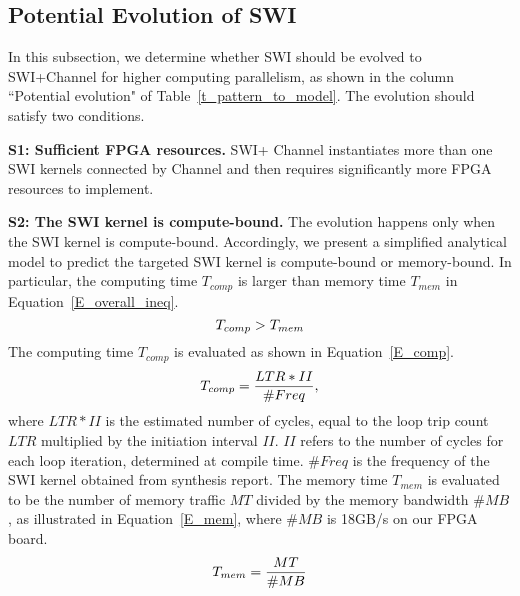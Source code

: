 \subsection{Potential Evolution of SWI}
\label{subsec_potential_prediction}
In this subsection, we determine whether SWI should be evolved to SWI+Channel for higher computing parallelism, as shown in the column ``Potential evolution" of Table~\ref{t_pattern_to_model}. The evolution should satisfy two conditions. 

\noindent
{\bf S1: Sufficient FPGA resources. }SWI+ Channel instantiates more than one SWI kernels connected by Channel and then requires significantly more FPGA resources to implement. %

\noindent
{\bf S2: The SWI kernel is compute-bound. }The evolution happens only when the SWI kernel is compute-bound. Accordingly, we present a simplified analytical model to predict the targeted SWI kernel is compute-bound or memory-bound. In particular, the computing time $T_{comp}$ is larger than memory time $T_{mem}$  in Equation~\ref{E_overall_ineq}.
\begin{equation} \begin{scriptsize}
\label{E_overall_ineq}
\vspace{-1ex}
T_{comp} > T_{mem}
\vspace{-1ex}
\end{scriptsize} \end{equation}
The computing time $T_{comp}$ is evaluated as shown in Equation~\ref{E_comp}.
\begin{equation} \begin{scriptsize}
\label{E_comp}
\vspace{-1ex}
T_{comp} = \frac{LTR*II}{\#Freq}, 
\vspace{-1ex}
\end{scriptsize} \end{equation}
where $LTR*II$ is the estimated number of cycles, equal to the loop trip count $LTR$ multiplied by the initiation interval $II$. $II$ refers to the number of cycles for each loop iteration, determined at compile time. $\#Freq$ is the frequency of the SWI kernel obtained from synthesis report. 
The memory time $T_{mem}$ is evaluated to be the number of memory traffic $MT$ divided by the memory bandwidth $\#MB$, as illustrated in Equation~\ref{E_mem}, where $\#MB$ is 18GB/s on our FPGA board.  
\begin{equation} \begin{scriptsize}
\label{E_mem}
\vspace{-1ex}
T_{mem} = \frac{MT}{\#MB} 
\vspace{-1ex}
\end{scriptsize} \end{equation}


